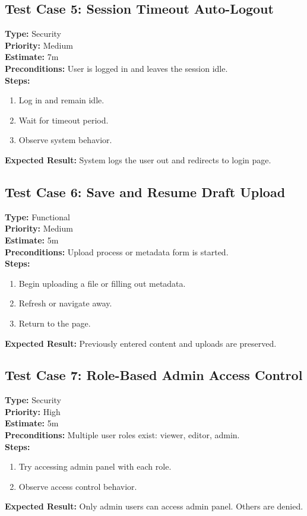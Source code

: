 \documentclass[12pt]{article}
\begin{document}
\subsection*{Test Case 5: Session Timeout Auto-Logout}
\textbf{Type:} Security \\
\textbf{Priority:} Medium \\
\textbf{Estimate:} 7m \\
\textbf{Preconditions:} User is logged in and leaves the session idle. \\
\textbf{Steps:}
\begin{enumerate}[label=\arabic*.]
\item Log in and remain idle.
\item Wait for timeout period.
\item Observe system behavior.
\end{enumerate}
\textbf{Expected Result:} System logs the user out and redirects to login page.

\subsection*{Test Case 6: Save and Resume Draft Upload}
\textbf{Type:} Functional \\
\textbf{Priority:} Medium \\
\textbf{Estimate:} 5m \\
\textbf{Preconditions:} Upload process or metadata form is started. \\
\textbf{Steps:}
\begin{enumerate}[label=\arabic*.]
\item Begin uploading a file or filling out metadata.
\item Refresh or navigate away.
\item Return to the page.
\end{enumerate}
\textbf{Expected Result:} Previously entered content and uploads are preserved.

\subsection*{Test Case 7: Role-Based Admin Access Control}
\textbf{Type:} Security \\
\textbf{Priority:} High \\
\textbf{Estimate:} 5m \\
\textbf{Preconditions:} Multiple user roles exist: viewer, editor, admin. \\
\textbf{Steps:}
\begin{enumerate}[label=\arabic*.]
\item Try accessing admin panel with each role.
\item Observe access control behavior.
\end{enumerate}
\textbf{Expected Result:} Only admin users can access admin panel. Others are denied.
\end{document}
